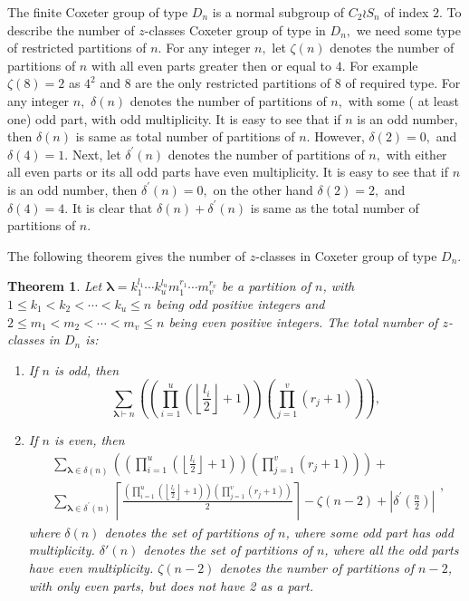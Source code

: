 \documentclass[12pt,twoside,reqno]{amsart}
\newtheorem{theorem}{Theorem}[section]
\theoremstyle{definition}
\numberwithin{equation}{section}
\newcommand{\Lbd}{\bm {\lambda}}
\begin{document}
The finite Coxeter group of type $D_n$ is a normal subgroup of $C_2\wr S_n$ of index $2.$  To describe the number of $z$-classes Coxeter group of type  in $D_n, $ we need some type of restricted partitions of $n.$ For any integer $n,$ let $\zeta(n)$ denotes the number of partitions of $n$ with all even parts greater then or equal to $4.$ For example $\zeta(8)=2$ as $4^2$ and $8$ are the only restricted partitions of $8$ of required type. For any integer $n,$ $\delta(n)$ denotes the number of partitions of $n,$ with some ( at least one) odd part, with odd multiplicity. It is easy to see that if $n$ is an odd number, then $\delta(n)$ is same as total number of partitions of $n.$
However, $\delta(2)=0,$ and $\delta(4)=1.$ Next, let $\delta^\prime(n)$ denotes the number of partitions of $n,$ with either all even parts or its all odd parts have even  multiplicity. It is easy to see that if $n$ is an odd number, then $\delta^\prime(n)=0,$ on the other hand $\delta(2)=2,$ and $\delta(4)=4.$ It is clear that $\delta(n)+\delta^\prime(n)$ is same as the total number of partitions of $n.$

The following theorem gives the number of $z$-classes in Coxeter group of type $D_n.$
\begin{theorem}\label{DMain2}
Let ${\Lbd} = k_1^{l_1}\cdots k_u^{l_u}m_1^{r_1}\cdots m_v^{r_v}$ be a partition of $n$, with $1 \leq k_1 < k_2 < \cdots < k_u \leq n$ being odd positive integers and $2\leq m_1 < m_2 < \cdots <m_v \leq n$ being even positive integers.
The total number of $z$-classes in $D_n$ is:
\begin{enumerate}
    \item If $n$ is odd, then
\begin{equation}\label{Emain1}\sum_{{\Lbd} \vdash n}\left( \left(\prod_{i=1}^u \left(\left\lfloor \frac{l_i}{2}\right\rfloor + 1\right)\right)\left(\prod_{j=1}^v (r_j+1)\right)\right),\end{equation}
\item If $n$ is even, then\begin{equation}\label{Emain2}\begin{matrix}\sum_{\Lbd \in \delta(n) }\left( \left(\prod_{i=1}^u \left(\left\lfloor \frac{l_i}{2}\right\rfloor + 1\right)\right)\left(\prod_{j=1}^v (r_j+1)\right)\right)+\\ \sum_{{\Lbd} \in \delta^\prime(n) }\left\lceil \frac{\left(\prod_{i=1}^u \left(\left\lfloor \frac{l_i}{2}\right\rfloor + 1\right)\right)\left(\prod_{j=1}^v (r_j+1)\right)}{2}\right\rceil-\zeta(n-2)+|\delta^\prime\left(\frac{n}{2}\right)|\end{matrix},\end{equation}
where $\delta(n)$ denotes the set of partitions of $n$, where some odd part has odd multiplicity. $\delta'(n)$ denotes the set of partitions of $n$, where all the odd parts have even multiplicity. $\zeta(n-2)$ denotes the number of partitions of $n-2$, with only even parts, but does not have 2 as a part. 
\end{enumerate}\end{theorem}
\end{document}

